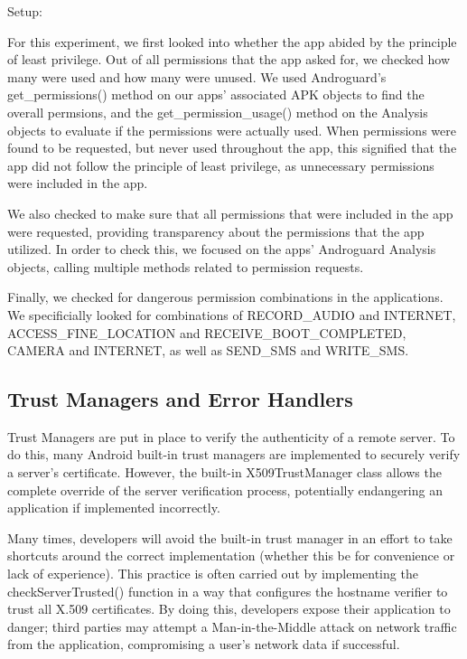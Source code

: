         Setup: 
        
        For this experiment, we first looked into whether the app abided by the 
        principle  of least privilege. Out of all permissions that the app asked 
        for, we checked how many were used and how many were unused. We used 
        Androguard's get\_permissions() method on our apps' associated APK 
        objects to find the overall permsions, and the get\_permission\_usage() method on 
        the Analysis objects to evaluate if the permissions were actually used.  When permissions 
        were found to be requested, but never used throughout the app, this signified
        that the app did not follow the principle of least privilege, as unnecessary 
        permissions were included in the app. 

        We also checked to make sure that all permissions that were included in the app
        were requested, providing transparency about the permissions that the app 
        utilized. In order to check this, we focused on the apps' Androguard Analysis objects, 
        calling multiple methods related to permission requests. 

        Finally, we checked for dangerous permission combinations in the applications. 
        We specificially looked for combinations of RECORD\_AUDIO and 
        INTERNET, ACCESS\_FINE\_LOCATION and RECEIVE\_BOOT\_COMPLETED, CAMERA and 
        INTERNET, as well as SEND\_SMS and WRITE\_SMS. 

    \subsection{Trust Managers and Error Handlers}

        Trust Managers are put in place to verify the authenticity of a 
        remote server. To do this, many Android built-in trust managers 
        are implemented to securely verify a server's certificate.
        However, the built-in X509TrustManager class allows the complete 
        override of the server verification process, potentially endangering
        an application if implemented incorrectly.

        Many times, developers will avoid the built-in trust manager in an
        effort to take shortcuts around the correct implementation (whether
        this be for convenience or lack of experience). This practice is often
        carried out by implementing the checkServerTrusted() function in a way 
        that configures the hostname verifier to trust all X.509 certificates. 
        By doing this, developers expose their application to danger; 
        third parties may attempt a Man-in-the-Middle attack on network traffic
        from the application, compromising a user's network data if successful.

